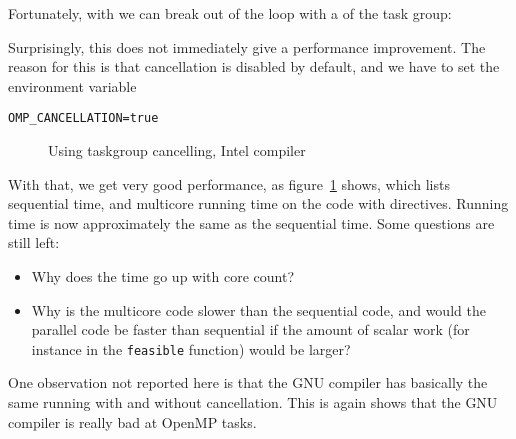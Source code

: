 Fortunately, with  we can break out of the loop
with a  of the task group:
%

Surprisingly, this does not immediately give a performance improvement.
The reason for this is that cancellation is disabled by default,
and we have to set the environment variable
\begin{verbatim}
OMP_CANCELLATION=true
\end{verbatim}

\begin{figure}
  \caption{Using taskgroup cancelling, Intel compiler}
  \label{fig:omp-dfs-cancel}
\end{figure}

With that, we get very good performance,
as  figure~\ref{fig:omp-dfs-cancel} shows,
which lists sequential time, and
multicore running time on the code with  directives.
Running time is now approximately the same as the sequential time.
Some questions are still left:
\begin{itemize}
\item Why does the time go up with core count?
\item Why is the multicore code slower than the sequential code,
  and would the parallel code be faster than sequential if the
  amount of scalar work (for instance in the \lstinline{feasible} function)
  would be larger?
\end{itemize}

One observation not reported here
is that the GNU compiler has basically the same running with and without cancellation.
This is again shows that the GNU compiler is really bad at OpenMP tasks.


